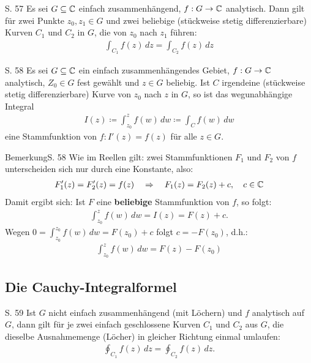 \begin{satz}{S. 57}
  \label{satz:5_3}
  Es sei $G \subseteq \mathbb{C}$ einfach zusammenhängend, $f: G \to \mathbb{C}$ analytisch.
  Dann gilt für zwei Punkte $z_0, z_1 \in G$ und zwei beliebige (stückweise stetig differenzierbare) Kurven $C_1$ und $C_2$ in $G$, die von $z_0$ nach $z_1$ führen:
  \begin{align}
    \int_{C_1} f(z) \, dz = \int_{C_2} f(z) \, dz
  \end{align}
\end{satz}

\begin{satz}{S. 58}
  Es sei $G \subseteq \mathbb{C}$ ein einfach zusammenhängendes Gebiet, $f: G \to \mathbb{C}$ analytisch, $Z_0 \in G$ fest gewählt und $z \in G$ beliebig.
  Ist $C$ irgendeine (stückweise stetig differenzierbare) Kurve von $z_0$ nach $z$ in $G$, so ist das wegunabhängige Integral
  \begin{align}
    I(z) \coloneqq \int_{z_0}^z f(w) \, dw \coloneqq \int_C f(w) \, dw
  \end{align}
  eine Stammfunktion von $f: I'(z) = f(z)$ für alle $z \in G$.
\end{satz}

\begin{bemerkung}{Bemerkung}{S. 58}
  Wie im Reellen gilt: zwei Stammfunktionen $F_1$ und $F_2$ von $f$ unterscheiden sich nur durch eine Konstante, also:
  \begin{align}
    F_1'(z) = F_2'(z) = f(z)
    \quad \Rightarrow \quad
    F_1(z) = F_2(z) + c, \quad c \in \mathbb{C}
  \end{align}
  Damit ergibt sich: Ist $F$ eine \textbf{beliebige} Stammfunktion von $f$, so folgt:
  \begin{align}
    \int_{z_0}^z f(w) \, dw = I(z) = F(z) + c .
  \end{align}
  Wegen $\displaystyle 0 = \int_{z_0}^{z_0} f(w) \, dw = F(z_0) + c$ folgt $c = -F(z_0)$, d.h.:
  \begin{align}
    \int_{z_0}^z f(w) \, dw = F(z) - F(z_0)
  \end{align}
\end{bemerkung}



\subsection{Die Cauchy-Integralformel}

\begin{satz}{S. 59}
  Ist $G$ nicht einfach zusammenhängend (mit \glqq Löchern\grqq ) und $f$ analytisch auf $G$, dann gilt für je zwei einfach geschlossene Kurven $C_1$ und $C_2$ aus $G$, die dieselbe Ausnahmemenge (\glqq Löcher\grqq ) in gleicher Richtung einmal umlaufen:
  \begin{align}
    \oint_{C_1} f(z) \, dz = \oint_{C_2} f(z) \, dz .
  \end{align}
\end{satz}

